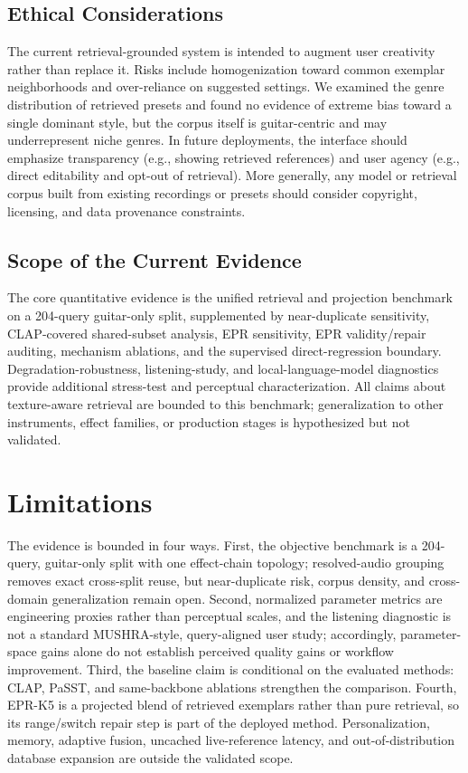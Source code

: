 \subsection{Ethical Considerations}

The current retrieval-grounded system is intended to augment user creativity rather than replace it. Risks include homogenization toward common exemplar neighborhoods and over-reliance on suggested settings. We examined the genre distribution of retrieved presets and found no evidence of extreme bias toward a single dominant style, but the corpus itself is guitar-centric and may underrepresent niche genres. In future deployments, the interface should emphasize transparency (e.g., showing retrieved references) and user agency (e.g., direct editability and opt-out of retrieval). More generally, any model or retrieval corpus built from existing recordings or presets should consider copyright, licensing, and data provenance constraints.

\subsection{Scope of the Current Evidence}
\label{ssec:memory_exp}

The core quantitative evidence is the unified retrieval and projection benchmark on a 204-query guitar-only split, supplemented by near-duplicate sensitivity, CLAP-covered shared-subset analysis, EPR sensitivity, EPR validity/repair auditing, mechanism ablations, and the supervised direct-regression boundary. Degradation-robustness, listening-study, and local-language-model diagnostics provide additional stress-test and perceptual characterization. All claims about texture-aware retrieval are bounded to this benchmark; generalization to other instruments, effect families, or production stages is hypothesized but not validated.

\section{Limitations}
\label{sec:limitations}

The evidence is bounded in four ways. First, the objective benchmark is a 204-query, guitar-only split with one effect-chain topology; resolved-audio grouping removes exact cross-split reuse, but near-duplicate risk, corpus density, and cross-domain generalization remain open. Second, normalized parameter metrics are engineering proxies rather than perceptual scales, and the listening diagnostic is not a standard MUSHRA-style, query-aligned user study; accordingly, parameter-space gains alone do not establish perceived quality gains or workflow improvement. Third, the baseline claim is conditional on the evaluated methods: CLAP, PaSST, and same-backbone ablations strengthen the comparison. Fourth, EPR-K5 is a projected blend of retrieved exemplars rather than pure retrieval, so its range/switch repair step is part of the deployed method. Personalization, memory, adaptive fusion, uncached live-reference latency, and out-of-distribution database expansion are outside the validated scope.

